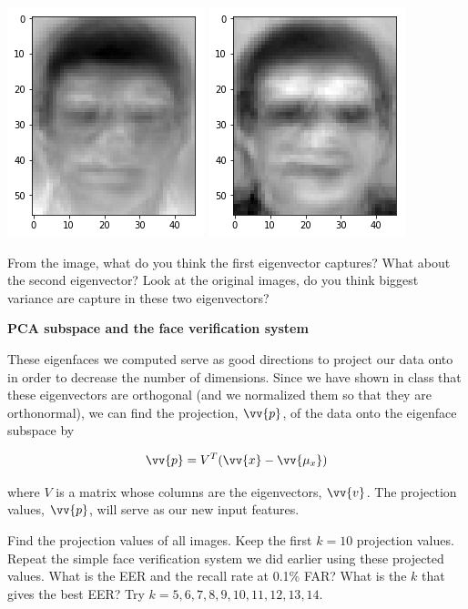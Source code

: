 \documentclass{article}
\newcounter{question}
\begin{document}
\includegraphics[scale=0.5]{eig1.png}
\includegraphics[scale=0.5]{eig2.png}

\question From the image, what do you think the first eigenvector captures? What about the second eigenvector? Look at the original images, do you think biggest variance are capture in these two eigenvectors?

\textbf{PCA subspace and the face verification system}

These eigenfaces we computed serve as good directions to project our data onto in order to decrease the number of dimensions. Since we have shown in class that these eigenvectors are orthogonal (and we normalized them so that they are orthonormal), we can find the projection, $\vv{p}$, of the data onto the eigenface subspace by

\begin{equation}
    \vv{p} = V^T (\vv{x} - \vv{\mu_x})
\end{equation}

where $V$ is a matrix whose columns are the eigenvectors, $\vv{v}$. The projection values, $\vv{p}$, will serve as our new input features.

\question Find the projection values of all images. Keep the first $k=10$ projection values. Repeat the simple face verification system we did earlier using these projected values. What is the EER and the recall rate at 0.1\% FAR?
\question What is the $k$ that gives the best EER? Try $k= 5, 6, 7, 8, 9, 10, 11, 12, 13, 14$.
\end{document}
